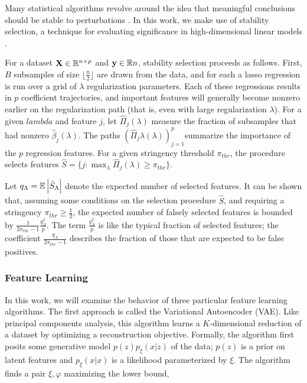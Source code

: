 Many statistical algorithms revolve around the idea that meaningful conclusions should be stable to perturbations \cite{yu2013stability}. In this work, we make use of stability selection, a technique for evaluating significance in high-dimensional linear models \cite{meinshausen2010stability}.

For a dataset $\mathbf{X}\in \mathbb{R}^{n \times p}$ and $\mathbf{y} \in \mathbb{R}{n}$, stability selection proceeds as follows. First, $B$ subsamples of size $\lfloor \frac{n}{2} \rfloor$ are drawn from the data, and for each a lasso regression is run over a grid of $\lambda$ regularization parameters. Each of these regressions results in $p$ coefficient trajectories, and important features will generally become nonzero earlier on the regularization path (that is, even with large regularization $\lambda$). For a given $lambda$ and feature $j$, let $\hat{\Pi}_{j}\left(\lambda\right)$ measure the fraction of subsamples that had nonzero $\hat{\beta}_j\left(\lambda\right)$.  The paths $\left(\hat{\Pi}_{j}\lambda\left(\lambda\right)\right)_{j = 1}^{p}$summarize the importance of the $p$ regression features. For a given stringency threshold $\pi_{thr}$, the procedure selects features $\hat{S} = \{j : \max_{\lambda} \hat{\Pi}_{j}\left(\lambda\right) \geq \pi_{thr}\}$.

Let $q_{\Lambda} = \mathbb{E}\left|{\hat{S}_{\Lambda}}\right|$ denote the expected number of
selected features. It can be shown that, assuming some conditions on the
selection procedure $\hat{S}$, and requiring a stringency $\pi_{thr} \geq
\frac{1}{2}$, the expected number of falsely selected features is bounded by
$\frac{1}{2\pi_{thr} - 1} \frac{q_{\Lambda}^2}{p}$. The term
$\frac{q_{\Lambda}^2}{p}$ is like the typical fraction of selected features; the
coefficient $\frac{q_{\Lambda}}{2\pi_{thr} - 1}$ describes the fraction of those
that are expected to be false positives.

\subsubsection{Feature Learning}

In this work, we will examine the behavior of three particular feature learning algorithms. The first approach is called the Variational Autoencoder (VAE). Like principal components analysis, this algorithm learns a $K$-dimensional reduction of a dataset by optimizing a reconstruction objective. Formally, the algorithm first posits some generative model $p\left(z\right)p_{\xi}\left(x \vert z\right)$ of the data; $p\left(z\right)$ is a prior on latent features and $p_{\xi}\left(x \vert x\right)$ is a likelihood parameterized by $\xi$. The algorithm finds a pair $\xi, \varphi$ maximizing the lower bound,

